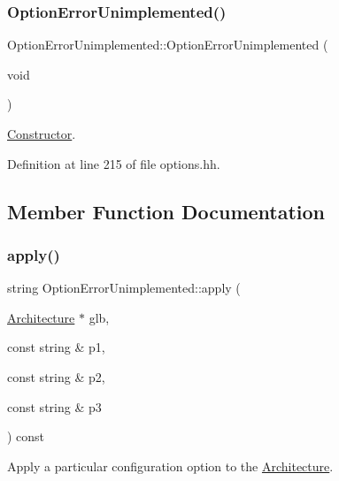 \subsubsection{\texorpdfstring{OptionErrorUnimplemented()}{OptionErrorUnimplemented()}}
{\footnotesize\ttfamily Option\+Error\+Unimplemented\+::\+Option\+Error\+Unimplemented (\begin{DoxyParamCaption}\item[{void}]{ }\end{DoxyParamCaption})\hspace{0.3cm}{\ttfamily [inline]}}



\mbox{\hyperlink{class_constructor}{Constructor}}. 



Definition at line 215 of file options.\+hh.



\subsection{Member Function Documentation}
\mbox{\label{class_option_error_unimplemented_a02c390db41fb158de4a6388210bd6075}} 
\subsubsection{\texorpdfstring{apply()}{apply()}}
{\footnotesize\ttfamily string Option\+Error\+Unimplemented\+::apply (\begin{DoxyParamCaption}\item[{\mbox{\hyperlink{class_architecture}{Architecture}} $\ast$}]{glb,  }\item[{const string \&}]{p1,  }\item[{const string \&}]{p2,  }\item[{const string \&}]{p3 }\end{DoxyParamCaption}) const\hspace{0.3cm}{\ttfamily [virtual]}}



Apply a particular configuration option to the \mbox{\hyperlink{class_architecture}{Architecture}}. 


